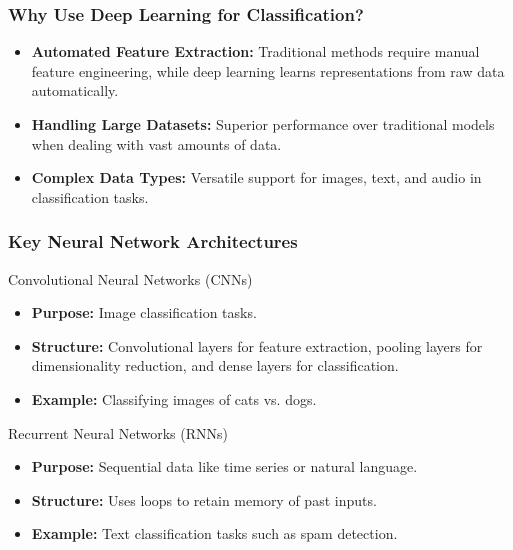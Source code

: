 \documentclass[aspectratio=169]{beamer}
\begin{document}
\begin{frame}[fragile]
    \frametitle{Why Use Deep Learning for Classification?}
    \begin{itemize}
        \item \textbf{Automated Feature Extraction:} 
        Traditional methods require manual feature engineering, while deep learning learns representations from raw data automatically.
        
        \item \textbf{Handling Large Datasets:}
        Superior performance over traditional models when dealing with vast amounts of data.
        
        \item \textbf{Complex Data Types:}
        Versatile support for images, text, and audio in classification tasks.
    \end{itemize}
\end{frame}

\begin{frame}[fragile]
    \frametitle{Key Neural Network Architectures}
    \begin{block}{Convolutional Neural Networks (CNNs)}
        \begin{itemize}
            \item \textbf{Purpose:} Image classification tasks.
            \item \textbf{Structure:} 
            Convolutional layers for feature extraction, pooling layers for dimensionality reduction, and dense layers for classification.
            \item \textbf{Example:} Classifying images of cats vs. dogs.
        \end{itemize}
    \end{block}
    \begin{block}{Recurrent Neural Networks (RNNs)}
        \begin{itemize}
            \item \textbf{Purpose:} Sequential data like time series or natural language.
            \item \textbf{Structure:} Uses loops to retain memory of past inputs.
            \item \textbf{Example:} Text classification tasks such as spam detection.
        \end{itemize}
    \end{block}
\end{frame}
\end{document}
